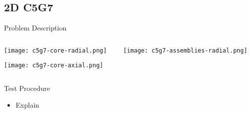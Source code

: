 
\subsection{2D C5G7}
\begin{frame}[t]{Problem Description}
 
\begin{columns}
\begin{column}{0.6\textwidth}
\vspace{-0.25in}
\begin{center}
\texttt{[image: c5g7-core-radial.png]}

\texttt{[image: c5g7-core-axial.png]}
\end{center}
\end{column}
\begin{column}{0.4\textwidth}
    \begin{center}
    \texttt{[image: c5g7-assemblies-radial.png]}
\end{center}
\end{column}
\end{columns}
    
\end{frame}


\begin{frame}[t]{Test Procedure}
    
    \begin{itemize}
        \item Explain
    \end{itemize}
    
\end{frame}


